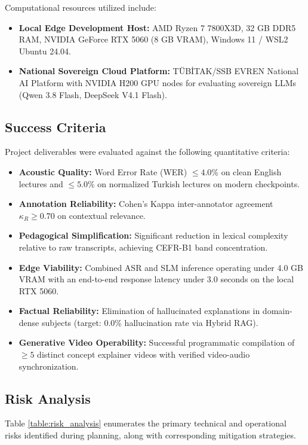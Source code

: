 \documentclass[a4paper,12pt]{report}
\begin{document}
Computational resources utilized include:
\begin{itemize}
    \item \textbf{Local Edge Development Host:} AMD Ryzen 7 7800X3D, 32 GB DDR5 RAM, NVIDIA GeForce RTX 5060 (8 GB VRAM), Windows 11 / WSL2 Ubuntu 24.04.
    \item \textbf{National Sovereign Cloud Platform:} TÜBİTAK/SSB EVREN National AI Platform with NVIDIA H200 GPU nodes for evaluating sovereign LLMs (Qwen 3.8 Flash, DeepSeek V4.1 Flash).
\end{itemize}

\subsection{Success Criteria}
Project deliverables were evaluated against the following quantitative criteria:
\begin{itemize}
    \item \textbf{Acoustic Quality:} Word Error Rate (WER) $\le 4.0\%$ on clean English lectures and $\le 5.0\%$ on normalized Turkish lectures on modern checkpoints.
    \item \textbf{Annotation Reliability:} Cohen's Kappa inter-annotator agreement $\kappa_R \ge 0.70$ on contextual relevance.
    \item \textbf{Pedagogical Simplification:} Significant reduction in lexical complexity relative to raw transcripts, achieving CEFR-B1 band concentration.
    \item \textbf{Edge Viability:} Combined ASR and SLM inference operating under 4.0 GB VRAM with an end-to-end response latency under 3.0 seconds on the local RTX 5060.
    \item \textbf{Factual Reliability:} Elimination of hallucinated explanations in domain-dense subjects (target: 0.0\% hallucination rate via Hybrid RAG).
    \item \textbf{Generative Video Operability:} Successful programmatic compilation of $\ge 5$ distinct concept explainer videos with verified video-audio synchronization.
\end{itemize}

\subsection{Risk Analysis}
Table \ref{table:risk_analysis} enumerates the primary technical and operational risks identified during planning, along with corresponding mitigation strategies.
\end{document}
